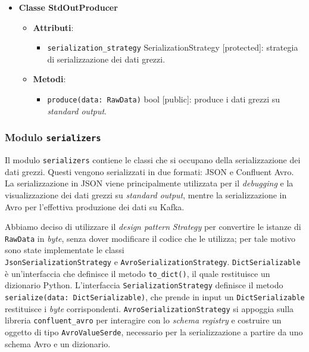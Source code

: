 \begin{itemize}
\begin{itemize}
\begin{itemize}
		            \end{itemize}
	      \end{itemize}
	\item \textbf{Classe StdOutProducer}
	      \begin{itemize}
		      \item \textbf{Attributi}:
		            \begin{itemize}
			            \item \texttt{serialization\_strategy} SerializationStrategy [protected]: strategia di serializzazione dei dati grezzi.
		            \end{itemize}
		      \item \textbf{Metodi}:
		            \begin{itemize}
			            \item \texttt{produce(data: RawData)} bool [public]: produce i dati grezzi su \textit{standard output}.
		            \end{itemize}
	      \end{itemize}
\end{itemize}

\subsubsection{Modulo \texttt{serializers}}
Il modulo \texttt{serializers} contiene le classi che si occupano della serializzazione dei dati grezzi. Questi vengono serializzati in due formati: JSON e Confluent Avro.
La serializzazione in JSON viene principalmente utilizzata per il \textit{debugging} e la visualizzazione dei dati grezzi su \textit{standard output}, mentre la serializzazione in Avro
per l'effettiva produzione dei dati su Kafka.

Abbiamo deciso di utilizzare il \textit{design pattern} \textit{Strategy} per convertire le istanze di \texttt{RawData} in \textit{byte}, senza dover modificare il codice che le utilizza;
per tale motivo sono state implementate le classi \\\texttt{JsonSerializationStrategy} e \texttt{AvroSerializationStrategy}.
\texttt{DictSerializable} è un'interfaccia che definisce il metodo \texttt{to\_dict()}, il quale restituisce un dizionario Python.
L'interfaccia \texttt{SerializationStrategy} definisce il metodo \texttt{serialize(data: DictSerializable)}, che prende in input un \texttt{DictSerializable} restituisce i \textit{byte} corrispondenti.
\texttt{AvroSerializationStrategy} si appoggia sulla libreria \texttt{confluent\_avro} per interagire con lo \textit{schema registry} e costruire un oggetto di tipo
\texttt{AvroValueSerde}, necessario per la serializzazione a partire da uno schema Avro e un dizionario.

